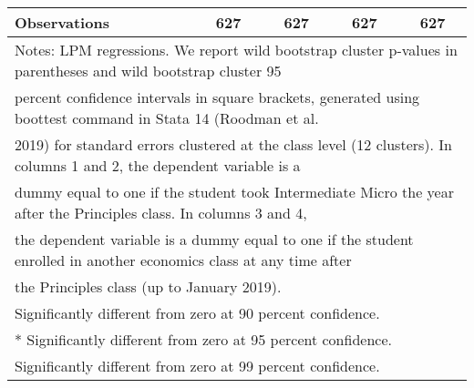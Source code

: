 \begin{table}[]
{\begin{tabular}{@{\extracolsep{2pt}}l*{4}{c}@{}}
\hline
Observations & 627 & 627 & 627 & 627 \\
\hline\hline
\multicolumn{5}{l}{\footnotesize Notes: LPM regressions. We report wild bootstrap cluster p-values in parentheses and wild bootstrap cluster 95}\vspace{-.25em} \\
\multicolumn{5}{l}{\footnotesize percent confidence intervals in square brackets, generated using boottest command in Stata 14 (Roodman et al.}\vspace{-.25em} \\
\multicolumn{5}{l}{\footnotesize 2019) for standard errors clustered at the class level (12 clusters). In columns 1 and 2, the dependent variable is a}\vspace{-.25em} \\
\multicolumn{5}{l}{\footnotesize dummy equal to one if the student took Intermediate Micro the year after the Principles class. In columns 3 and 4,}\vspace{-.25em} \\
\multicolumn{5}{l}{\footnotesize the dependent variable is a dummy equal to one if the student enrolled in another economics class at any time after}\vspace{-.25em} \\
\multicolumn{5}{l}{\footnotesize the Principles class (up to January 2019).}\vspace{-.25em} \\
\multicolumn{5}{l}{\footnotesize * Significantly different from zero at 90 percent confidence.}\vspace{-.25em} \\
\multicolumn{5}{l}{\footnotesize ** Significantly different from zero at 95 percent confidence.}\vspace{-.25em} \\
\multicolumn{5}{l}{\footnotesize * Significantly different from zero at 99 percent confidence.}
\end{tabular}
}
\end{table}